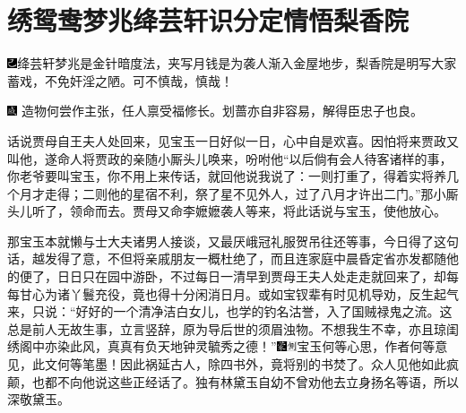 

\chapter{绣鸳鸯梦兆绛芸轩\hspace{.5em}识分定情悟梨香院}

{\includegraphics[width=3mm]{../Images/00003}绛芸轩梦兆是金针暗度法，夹写月钱是为袭人渐入金屋地步，梨香院是明写大家蓄戏，不免奸淫之陋。可不慎哉，慎哉！}

{\includegraphics[width=3mm]{../Images/00005}  \kaishu 造物何尝作主张，任人禀受福修长。划蔷亦自非容易，解得臣忠子也良。}

话说贾母自王夫人处回来，见宝玉一日好似一日，心中自是欢喜。因怕将来贾政又叫他，遂命人将贾政的亲随小厮头儿唤来，吩咐他``以后倘有会人待客诸样的事，你老爷要叫宝玉，你不用上来传话，就回他说我说了：一则打重了，得着实将养几个月才走得；二则他的星宿不利，祭了星不见外人，过了八月才许出二门。''那小厮头儿听了，领命而去。贾母又命李嬷嬷袭人等来，将此话说与宝玉，使他放心。

那宝玉本就懒与士大夫诸男人接谈，又最厌峨冠礼服贺吊往还等事，今日得了这句话，越发得了意，不但将亲戚朋友一概杜绝了，而且连家庭中晨昏定省亦发都随他的便了，日日只在园中游卧，不过每日一清早到贾母王夫人处走走就回来了，却每每甘心为诸丫鬟充役，竟也得十分闲消日月。或如宝钗辈有时见机导劝，反生起气来，只说：``好好的一个清净洁白女儿，也学的钓名沽誉，入了国贼禄鬼之流。这总是前人无故生事，立言竖辞，原为导后世的须眉浊物。不想我生不幸，亦且琼闺绣阁中亦染此风，真真有负天地钟灵毓秀之德！''{\includegraphics[width=3mm]{../Images/00006}\includegraphics[width=3mm]{../Images/00011}\footnotesize \kaishu 宝玉何等心思，作者何等意见，此文何等笔墨！}因此祸延古人，除四书外，竟将别的书焚了。众人见他如此疯颠，也都不向他说这些正经话了。独有林黛玉自幼不曾劝他去立身扬名等语，所以深敬黛玉。

